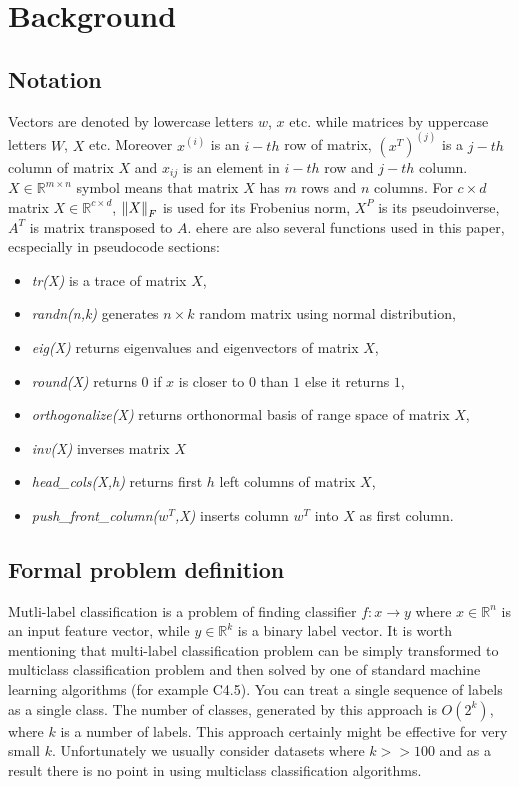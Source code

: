 
\chapter{Background}
\section{Notation}

Vectors are denoted by lowercase letters $w$, $x$ etc. while matrices by uppercase letters $W$, $X$ etc. Moreover $x^{(i)}$ is an $i-th$ row of matrix, $(x^T)^{(j)}$ is a $j-th$ column of matrix $X$ and $x_{ij}$ is an element in $i-th$ row and $j-th$ column. $X \in \mathbb{R}^{m \times n}$ symbol means that matrix $X$ has $m$ rows and $n$ columns. For $c \times d$  matrix $X \in \mathbb{R}^{c \times d}$, $\left\lVert X\right\rVert_{F}$ is used for its Frobenius norm, $X^P$ is its pseudoinverse, $A^T$ is matrix transposed to $A$. 
ehere are also several functions used in this paper, ecspecially in pseudocode sections:
\begin{itemize}
\item \textit{tr(X)} is a trace of matrix $X$, 
\item \textit{randn(n,k)} generates $n \times k$ random matrix using normal distribution,
\item \textit{eig(X)} returns eigenvalues and eigenvectors of matrix $X$,
\item \textit{round(X)} returns $0$ if $x$ is closer to $0$ than $1$ else it returns $1$,
\item \textit{orthogonalize(X)} returns orthonormal basis of range space of matrix $X$,
\item \textit{inv(X)} inverses matrix $X$
\item \textit{head\_cols(X,h)} returns first $h$ left columns of matrix $X$,
\item \textit{push\_front\_column($w^T$,X)} inserts column $w^T$ into $X$ as first column.

\end{itemize}

\section{Formal problem definition}
Mutli-label classification is a problem of finding classifier $f:x \rightarrow y$ where $x \in \mathbb{R}^n$ is an input feature vector, while $y \in \mathbb{R}^k$ is a binary label vector. It is worth mentioning that multi-label classification problem can be simply transformed to multiclass classification problem and then solved by one of standard machine learning algorithms (for example C4.5). You can treat a single sequence of labels as a single class. The number of classes, generated by this approach is $O(2^k)$, where $k$ is a number of labels. This approach certainly might be effective for very small $k$. Unfortunately we usually consider datasets where $k>>100$ and as a result there is no point in using multiclass classification algorithms.     

